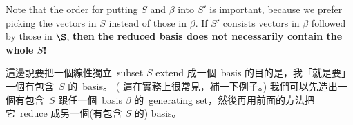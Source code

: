 \begin{remark} \label{remark 3.4.5}
Note that the order for putting \(S\) and \(\beta\) into \(S'\) is important,
because we prefer picking the vectors in \(S\) instead of those in \(\beta\).
If \(S'\) consists vectors in \(\beta\) followed by those in \(\S\), \textbf{then the reduced basis does not necessarily contain the whole \(S\)!}
\end{remark}

\begin{note}
這邊說要把一個線性獨立\ subset \(S\) extend 成一個\ basis 的目的是，我「就是要」一個有包含\ \(S\) 的\ basis。
(\TODOREF{} 這在實務上很常見，補一下例子。)
我們可以先造出一個有包含\ \(S\) 跟任一個\ basis \(\beta\) 的\ generating set，然後再用前面的方法把它\ reduce 成另一個(有包含 \(S\) 的) basis。
\end{note}

